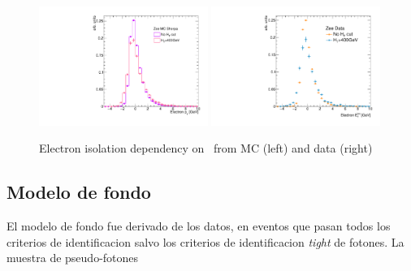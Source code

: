 \begin{figure}[h]
  \begin{center}
    \includegraphics[width=0.49\textwidth]{figures/electron_iso_ZeeHMC_corr}
    \includegraphics[width=0.49\textwidth]{figures/electron_iso_ZeeH_corr}
    \caption{Electron isolation dependency on \HT\ from MC (left) and data (right) \Zee}
    \label{fig:_electron_iso_HT}
  \end{center}
\end{figure}

\subsection{Modelo de fondo} \label{sec:jfake_bkg_template}

El modelo de fondo fue derivado de los datos, en eventos
que pasan todos los criterios de identificacion salvo los
criterios de identificacion \emph{tight} de fotones. La
muestra de pseudo-fotones


